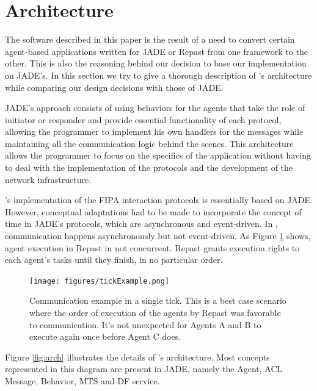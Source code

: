 \section{\apiname{} Architecture} %
\label{sec:proposal}

The software described in this paper is the result of a need to convert certain agent-based applications written for JADE or Repast from one framework to the other. This is also the reasoning behind our decision to base our implementation on JADE's. In this section we try to give a thorough description of \apiname{}'s architecture while comparing our design decisions with those of JADE.

JADE's approach consists of using behaviors for the agents that take the role of initiator or responder and provide essential functionality of each protocol, allowing the programmer to implement his own handlers for the messages while maintaining all the communication logic behind the scenes. This architecture allows the programmer to focus on the specifics of the application without having to deal with the implementation of the protocols and the development of the network infrastructure. \cite{bellifemine2003jade}

\apiname{}'s implementation of the FIPA interaction protocols is essentially based on JADE. However, conceptual adaptations had to be made to incorporate the concept of time in JADE's protocols, which are asynchronous and event-driven. In \apiname{}, communication happens asynchronously but not event-driven. As Figure \ref{fig:com-example} shows, agent execution in Repast in not concurrent. Repast grants execution rights to each agent's tasks until they finish, in no particular order.

\begin{figure}[h]
	\centering
	\texttt{[image: figures/tickExample.png]}
	\caption[Communication example]{
		Communication example in a single tick.
		This is a best case scenario where the order of execution of
		the agents by Repast was favorable to communication. It's not
		unexpected for Agents A and B to execute again once before
		Agent C does.
	}
	\label{fig:com-example}
\end{figure}



Figure \ref{fig:arch} illustrates the details of \apiname{}'s architecture. Most concepts represented in this diagram are present in JADE, namely the Agent, ACL Message, Behavior, MTS and DF service.

